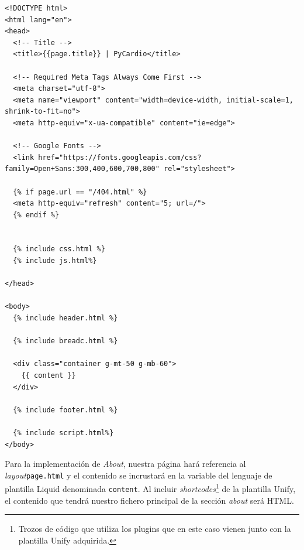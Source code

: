 \begin{lstlisting}[style=htmlcssjs,caption=Layout Page,label={code:layoutPage}]
<!DOCTYPE html>
<html lang="en">
<head>
  <!-- Title -->
  <title>{{page.title}} | PyCardio</title>

  <!-- Required Meta Tags Always Come First -->
  <meta charset="utf-8">
  <meta name="viewport" content="width=device-width, initial-scale=1, shrink-to-fit=no">
  <meta http-equiv="x-ua-compatible" content="ie=edge">

  <!-- Google Fonts -->
  <link href="https://fonts.googleapis.com/css?family=Open+Sans:300,400,600,700,800" rel="stylesheet">

  {% if page.url == "/404.html" %}
  <meta http-equiv="refresh" content="5; url=/">
  {% endif %}


  {% include css.html %}
  {% include js.html%}

</head>

<body>
  {% include header.html %}
  
  {% include breadc.html %}

  <div class="container g-mt-50 g-mb-60">
    {{ content }}
  </div>

  {% include footer.html %}

  {% include script.html%}
</body>
\end{lstlisting}

Para la implementación de \textit{About}, nuestra página hará referencia al \textit{layout}\texttt{page.html} y el contenido se incrustará en la variable del lenguaje de plantilla Liquid denominada \texttt{content}. Al incluir \textit{shortcodes}\footnote{Trozos de código que utiliza los plugins que en este caso vienen junto con la plantilla Unify adquirida.} de la plantilla Unify, el contenido que tendrá nuestro fichero principal de la sección \textit{about} será HTML.

